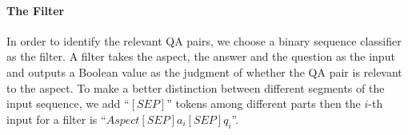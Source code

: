 %
%

\paragraph{The Filter}
In order to identify the relevant QA pairs, we choose a binary sequence classifier as the filter. 
A filter takes the aspect, the answer and the question as the input and outputs a Boolean value as the judgment of whether the QA pair is relevant to the aspect. 
To make a better distinction between different segments of the input sequence, we add ``$[SEP]$'' tokens among different parts then the $i$-th input for a filter is ``$Aspect [SEP] a_i [SEP] q_i$''.

